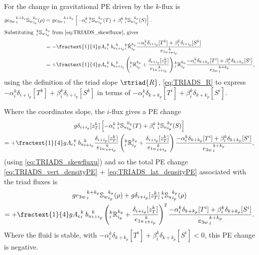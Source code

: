 \documentclass[../main/NEMO_manual]{subfiles}
\begin{document}
For the change in gravitational PE driven by the $k$-flux is
\begin{align}
  \label{eq:TRIADS_vert_densityPE}
  g {e_{3w}}_{\,i}^{\,k+k_p}{\mathbb{S}_w}_{i_p}^{k_p} (\rho)
  &=g {e_{3w}}_{\,i}^{\,k+k_p}\left[-\alpha _i^k {\:}_i^k
    {\mathbb{S}_w}_{i_p}^{k_p} (T) + \beta_i^k {\:}_i^k
    {\mathbb{S}_w}_{i_p}^{k_p} (S) \right]. \notag \\
  \intertext{Substituting  ${\:}_i^k {\mathbb{S}_w}_{i_p}^{k_p}$ from \autoref{eq:TRIADS_skewfluxw}, gives}
  &=-\fractext{1}{4} g{A_e}_i^k{\: }{b_u}_{i+i_p}^k {_i^k\tilde{\mathbb{R}}_{i_p}^{k_p}}
    \frac{ -\alpha _i^k\delta_{i+ i_p}[T^k]+ \beta_i^k\delta_{i+ i_p}[S^k]} { {e_{1u}}_{\,i + i_p}^{\,k} } \notag \\
  &=+\fractext{1}{4} g{A_e}_i^k{\: }{b_u}_{i+i_p}^k
    \left({_i^k\mathbb{R}_{i_p}^{k_p}}+\frac{\delta_{i+i_p}[z_T^k]}{{e_{1u}}_{\,i + i_p}^{\,k}}\right) {_i^k\mathbb{R}_{i_p}^{k_p}}
    \frac{-\alpha_i^k \delta_{k+ k_p}[T^i]+ \beta_i^k\delta_{k+ k_p}[S^i]} {{e_{3w}}_{\,i}^{\,k+k_p}},
\end{align}
using the definition of the triad slope $\rtriad{R}$, \autoref{eq:TRIADS_R} to
express $-\alpha _i^k\delta_{i+ i_p}[T^k]+\beta_i^k\delta_{i+ i_p}[S^k]$ in terms of
$-\alpha_i^k \delta_{k+ k_p}[T^i]+ \beta_i^k\delta_{k+ k_p}[S^i]$.

Where the coordinates slope, the $i$-flux gives a PE change
\begin{multline}
  \label{eq:TRIADS_lat_densityPE}
  g \delta_{i+i_p}[z_T^k]
  \left[
    -\alpha _i^k {\:}_i^k {\mathbb{S}_u}_{i_p}^{k_p} (T) + \beta_i^k {\:}_i^k {\mathbb{S}_u}_{i_p}^{k_p} (S)
  \right] \\
  = +\fractext{1}{4} g{A_e}_i^k{\: }{b_u}_{i+i_p}^k
  \frac{\delta_{i+i_p}[z_T^k]}{{e_{1u}}_{\,i + i_p}^{\,k}}
  \left({_i^k\mathbb{R}_{i_p}^{k_p}}+\frac{\delta_{i+i_p}[z_T^k]}{{e_{1u}}_{\,i + i_p}^{\,k}}\right)
  \frac{-\alpha_i^k \delta_{k+ k_p}[T^i]+ \beta_i^k\delta_{k+ k_p}[S^i]} {{e_{3w}}_{\,i}^{\,k+k_p}},
\end{multline}
(using \autoref{eq:TRIADS_skewfluxu}) and so the total PE change \autoref{eq:TRIADS_vert_densityPE} +
\autoref{eq:TRIADS_lat_densityPE} associated with the triad fluxes is
\begin{multline*}
  g{e_{3w}}_{\,i}^{\,k+k_p}{\mathbb{S}_w}_{i_p}^{k_p} (\rho) +
  g\delta_{i+i_p}[z_T^k] {\:}_i^k {\mathbb{S}_u}_{i_p}^{k_p} (\rho) \\
  = +\fractext{1}{4} g{A_e}_i^k{\: }{b_u}_{i+i_p}^k
  \left({_i^k\mathbb{R}_{i_p}^{k_p}}+\frac{\delta_{i+i_p}[z_T^k]}{{e_{1u}}_{\,i + i_p}^{\,k}}\right)^2
  \frac{-\alpha_i^k \delta_{k+ k_p}[T^i]+ \beta_i^k\delta_{k+ k_p}[S^i]} {{e_{3w}}_{\,i}^{\,k+k_p}}.
\end{multline*}
Where the fluid is stable, with $-\alpha_i^k \delta_{k+ k_p}[T^i]+
\beta_i^k\delta_{k+ k_p}[S^i]<0$, this PE change is negative.
\end{document}
